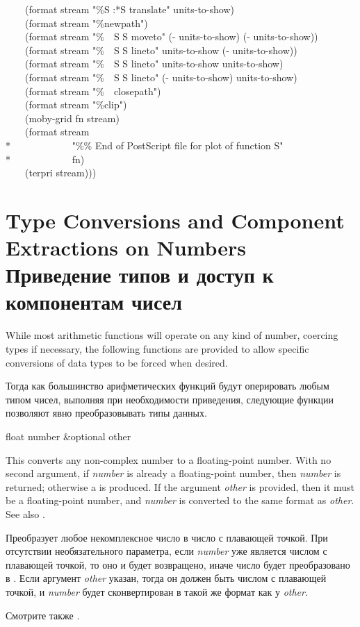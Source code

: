\begin{new}
\begin{lisp}
~~~~(format stream "{\Xtilde}\%{\Xtilde}S {\Xtilde}:*{\Xtilde}S translate" units-to-show) \\
~~~~(format stream "{\Xtilde}\%newpath") \\
~~~~(format stream "{\Xtilde}\%~~{\Xtilde}S {\Xtilde}S moveto" (- units-to-show) (- units-to-show)) \\
~~~~(format stream "{\Xtilde}\%~~{\Xtilde}S {\Xtilde}S lineto" units-to-show (- units-to-show)) \\
~~~~(format stream "{\Xtilde}\%~~{\Xtilde}S {\Xtilde}S lineto" units-to-show units-to-show) \\
~~~~(format stream "{\Xtilde}\%~~{\Xtilde}S {\Xtilde}S lineto" (- units-to-show) units-to-show) \\
~~~~(format stream "{\Xtilde}\%~~closepath") \\
~~~~(format stream "{\Xtilde}\%clip") \\
~~~~(moby-grid fn stream) \\
~~~~(format stream \\*
~~~~~~~~~~~~"{\Xtilde}\%\% End of PostScript file for plot of function {\Xtilde}S" \\*
~~~~~~~~~~~~fn) \\
~~~~(terpri stream)))
\end{lisp}
\endgroup
\end{new}

\section{Type Conversions and Component Extractions on Numbers Приведение типов
  и доступ к компонентам чисел}

While most arithmetic functions will operate on any kind of number,
coercing types if necessary, the following functions are provided to
allow specific conversions of data types to be forced when desired.

Тогда как большинство арифметических функций будут оперировать любым типом
чисел, выполняя при необходимости приведения, следующие функции позволяют явно
преобразовывать типы данных.

\begin{defun}[Function]
float number &optional other

This converts any non-complex number to a floating-point number.
With no second argument, if \emph{number} is already a floating-point
number, then \emph{number} is returned;
otherwise a  is produced.
If the argument \emph{other} is provided, then it must be a floating-point
number, and \emph{number} is converted to the same format as \emph{other}.
See also .

Преобразует любое некомплексное число в число с плавающей точкой.
При отсутствии необязательного параметра, если \emph{number} уже
является числом с плавающей точкой, то оно и будет возвращено, иначе число будет
преобразовано в .
Если аргумент \emph{other} указан, тогда он должен быть числом с плавающей
точкой, и \emph{number} будет сконвертирован в такой же формат как у
\emph{other}.

Смотрите также .
\end{defun}

